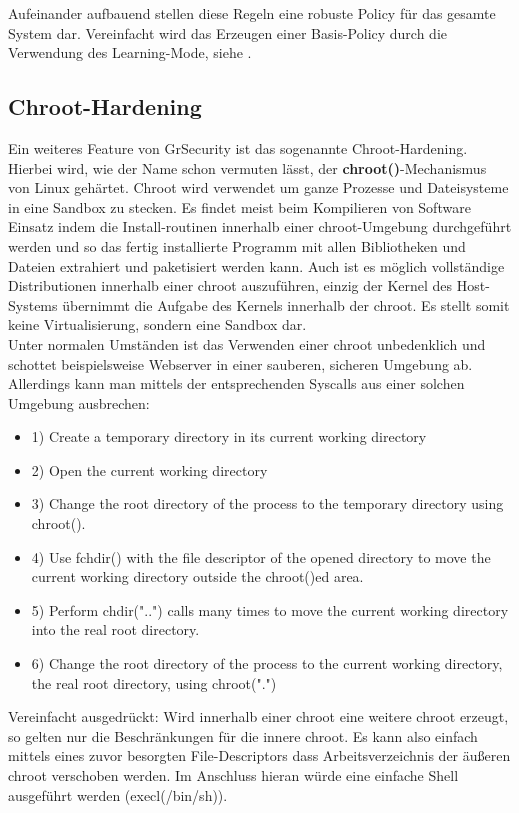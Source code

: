Aufeinander aufbauend stellen diese Regeln eine robuste Policy für das gesamte System dar. Vereinfacht wird das Erzeugen einer Basis-Policy durch die Verwendung des Learning-Mode, siehe .

\subsection{Chroot-Hardening}
\label{subsec:Chroot-Hardening}
Ein weiteres Feature von GrSecurity ist das sogenannte Chroot-Hardening. Hierbei wird, wie der Name schon vermuten lässt, der \textbf{chroot()}-Mechanismus von Linux gehärtet. Chroot wird verwendet um ganze Prozesse und Dateisysteme in eine Sandbox zu stecken. Es findet meist beim Kompilieren von Software Einsatz indem die Install-routinen innerhalb einer chroot-Umgebung durchgeführt werden und so das fertig installierte Programm mit allen Bibliotheken und Dateien extrahiert und paketisiert werden kann. Auch ist es möglich vollständige Distributionen innerhalb einer chroot auszuführen, einzig der Kernel des Host-Systems übernimmt die Aufgabe des Kernels innerhalb der chroot. Es stellt somit keine Virtualisierung, sondern eine Sandbox dar.\\
Unter normalen Umständen ist das Verwenden einer chroot unbedenklich und schottet beispielsweise Webserver in einer sauberen, sicheren Umgebung ab. Allerdings kann man mittels der entsprechenden Syscalls aus einer solchen Umgebung ausbrechen:
\begin{itemize}
\item 1) Create a temporary directory in its current working directory 
\item 2) Open the current working directory 
\item 3) Change the root directory of the process to the temporary directory using chroot(). 
\item 4) Use fchdir() with the file descriptor of the opened directory to move the current working directory outside the chroot()ed area. 
\item 5) Perform chdir("..") calls many times to move the current working directory into the real root directory.
\item 6) Change the root directory of the process to the current working directory, the real root directory, using chroot(".")
\end{itemize}

Vereinfacht ausgedrückt: Wird innerhalb einer chroot eine weitere chroot erzeugt, so gelten nur die Beschränkungen für die innere chroot. Es kann also einfach mittels eines zuvor besorgten File-Descriptors dass Arbeitsverzeichnis der äußeren chroot verschoben werden. Im Anschluss hieran würde eine einfache Shell ausgeführt werden (execl(/bin/sh)).

